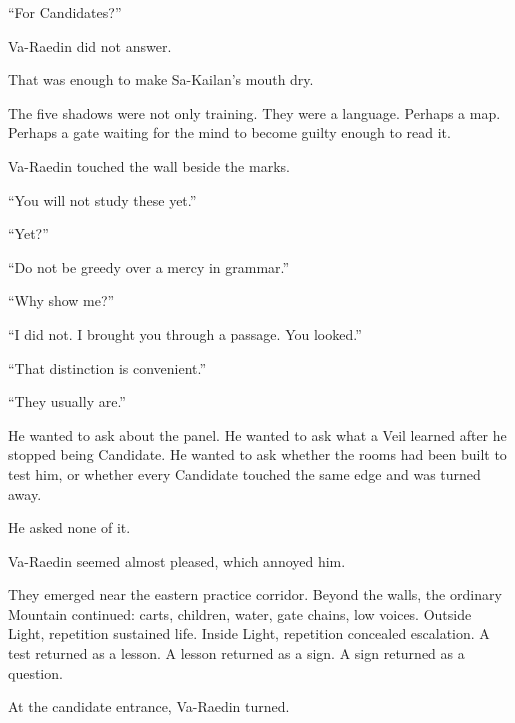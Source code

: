 “For Candidates?”\par

Va-Raedin did not answer.\par

That was enough to make Sa-Kailan’s mouth dry.\par

The five shadows were not only training.
They were a language.
Perhaps a map.
Perhaps a gate waiting for the mind to become guilty enough to read it.\par

Va-Raedin touched the wall beside the marks.\par

“You will not study these yet.”\par

“Yet?”\par

“Do not be greedy over a mercy in grammar.”\par

“Why show me?”\par

“I did not.
I brought you through a passage.
You looked.”\par

“That distinction is convenient.”\par

“They usually are.”\par

He wanted to ask about the panel.
He wanted to ask what a Veil learned after he stopped being Candidate.
He wanted to ask whether the rooms had been built to test him, or whether every Candidate touched the same edge and was turned away.\par

He asked none of it.\par

Va-Raedin seemed almost pleased, which annoyed him.\par

They emerged near the eastern practice corridor.
Beyond the walls, the ordinary Mountain continued: carts, children, water, gate chains, low voices.
Outside Light, repetition sustained life.
Inside Light, repetition concealed escalation.
A test returned as a lesson.
A lesson returned as a sign.
A sign returned as a question.\par

At the candidate entrance, Va-Raedin turned.\par

